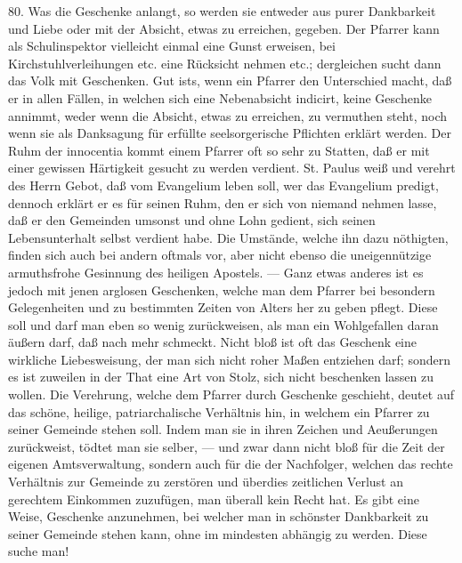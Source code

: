 80. Was die Geschenke anlangt, so werden sie entweder aus purer Dankbarkeit und Liebe oder mit der Absicht, etwas zu erreichen, gegeben. Der Pfarrer kann als Schulinspektor vielleicht einmal eine Gunst erweisen, bei Kirchstuhlverleihungen etc. eine Rücksicht nehmen etc.; dergleichen sucht dann das Volk mit Geschenken. Gut ists, wenn ein Pfarrer den Unterschied macht, daß er in allen Fällen, in welchen sich eine Nebenabsicht indicirt, keine Geschenke annimmt, weder wenn die Absicht, etwas zu erreichen, zu vermuthen steht, noch wenn sie als Danksagung für erfüllte seelsorgerische Pflichten erklärt werden. Der Ruhm der innocentia kommt einem Pfarrer oft so sehr zu Statten, daß er mit einer gewissen Härtigkeit gesucht zu werden verdient. St. Paulus weiß und verehrt des Herrn Gebot, daß vom Evangelium leben soll, wer das Evangelium predigt, dennoch erklärt er es für seinen Ruhm, den er sich von niemand nehmen lasse, daß er den Gemeinden umsonst und ohne Lohn gedient, sich seinen Lebensunterhalt selbst verdient habe. Die Umstände, welche ihn dazu nöthigten, finden sich auch bei andern oftmals vor, aber nicht ebenso die uneigennützige armuthsfrohe Gesinnung des heiligen Apostels. — Ganz etwas anderes ist es jedoch mit jenen arglosen Geschenken, welche man dem Pfarrer bei besondern Gelegenheiten und zu bestimmten Zeiten von Alters her zu geben pflegt. Diese soll und darf man eben so wenig zurückweisen, als man ein
Wohlgefallen daran äußern darf, daß nach mehr schmeckt. Nicht bloß ist oft das Geschenk eine wirkliche Liebesweisung, der man sich nicht roher Maßen entziehen darf; sondern es ist zuweilen in der That eine Art von Stolz, sich nicht beschenken lassen zu wollen. Die Verehrung, welche dem Pfarrer durch Geschenke geschieht, deutet auf das schöne, heilige, patriarchalische Verhältnis hin, in welchem ein Pfarrer zu seiner Gemeinde stehen soll. Indem man sie in ihren Zeichen und Aeußerungen zurückweist, tödtet man sie selber, — und zwar dann nicht bloß für die Zeit der eigenen Amtsverwaltung, sondern auch für die der Nachfolger, welchen das rechte Verhältnis zur Gemeinde zu zerstören und überdies zeitlichen Verlust an gerechtem Einkommen zuzufügen, man überall kein Recht hat. Es gibt eine Weise, Geschenke anzunehmen, bei welcher man in schönster Dankbarkeit zu seiner Gemeinde stehen kann, ohne im mindesten abhängig zu werden. Diese suche man!

